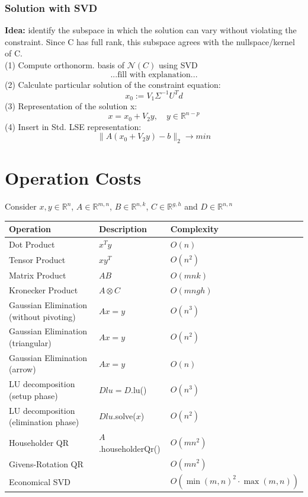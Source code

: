 \documentclass[12pt, a4paper]{article}
\newcommand{\R}{\mathbb{R}}
\begin{document}
\subsubsection{Solution with SVD}
\textbf{Idea:} identify the subspace in which the solution can vary without violating the constraint. Since C has full
rank, this subspace agrees with the nullspace/kernel of C.
\vspace{3mm} \\
(1) Compute orthonorm. basis of $\mathcal{N}(C)$ using SVD \\
\[ ... \text{fill with explanation} ... \]
(2) Calculate particular solution of the constraint equation: \\
\[ x_0 := V_1\Sigma^{-1}U^{T}d \] 
(3) Representation of the solution x: \\
\[ x =x_0 + V_2y, \quad  y \in \R^{n-p}\]
(4) Insert in Std. LSE representation:  \\
\[ \lVert A(x_0 + V_2y) - b\rVert_{2} \rightarrow min \]

\newpage
\section{Operation Costs}

Consider $x, y \in \mathbb{R}^n$, $A \in \mathbb{R}^{m,n}$, $B \in \mathbb{R}^{n,k}$, $C \in \mathbb{R}^{g,h}$ and $D \in \mathbb{R}^{n,n}$

\begin{table}[H]
\centering
\begin{tabular}{|l|l|l|}
\hline
\textbf{Operation} & \textbf{Description} & \textbf{Complexity} \\ \hline
Dot Product 	   & $x^Ty$ 				  & $O(n)$              \\ \hline
Tensor Product	   & $xy^T$               & $O(n^2)$			    \\ \hline
Matrix Product	   & $AB$             	  & $O(mnk)$			    \\ \hline
Kronecker Product  & $A \otimes C$        & $O(mngh)$			\\ \hline
Gaussian Elimination (without pivoting) & $Ax = y$        & $O(n^3)$			\\ \hline
Gaussian Elimination (triangular) & $Ax = y$        & $O(n^2)$			\\ \hline
Gaussian Elimination (arrow) & $Ax = y$        & $O(n)$			\\ \hline
LU decomposition (setup phase) & $Dlu = D$.lu()  & $O(n^3)$			\\ \hline
LU decomposition (elimination phase) & $Dlu$.solve($x$)  & $O(n^2)$			\\ \hline
Householder QR & $A$.householderQr()  & $O(mn^2)$			\\ \hline
Givens-Rotation QR &   & $O(mn^2)$			\\ \hline
Economical SVD & & $O(\min(m, n)^2\cdot\max(m,n))$ \\ \hline
\end{tabular}
\end{table}
\end{document}
